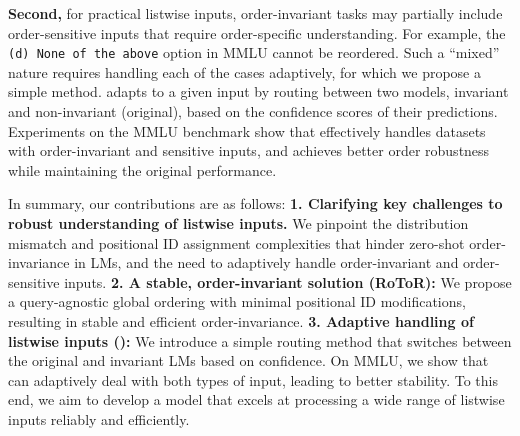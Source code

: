 \textbf{Second,} for practical listwise inputs, 
order-invariant tasks may partially include
order-sensitive inputs that require order-specific understanding. For example, the \texttt{(d) None of the above} option in MMLU cannot be reordered. Such a ``mixed'' nature
requires handling each of the cases adaptively, for which we propose a simple \sr{} method. \sr{} 
 adapts to a given input by routing between two models, invariant and non-invariant (original),
 based on the confidence scores of their predictions. Experiments on the MMLU benchmark show that \sr{} effectively handles datasets with order-invariant and sensitive inputs, and achieves better order robustness while maintaining the original performance.

In summary, our contributions are as follows:
\textbf{1. Clarifying key challenges to robust understanding of listwise inputs.} We pinpoint the distribution mismatch and positional ID assignment complexities that hinder zero-shot order-invariance in LMs, and the need to adaptively handle order-invariant and order-sensitive inputs. \textbf{2. A stable, order-invariant solution (RoToR):} We propose a query-agnostic global ordering with minimal positional ID modifications, resulting in stable and efficient order-invariance. \textbf{3. Adaptive handling of listwise inputs (\sr{}):} We introduce a simple routing method that switches between the original and invariant LMs based on confidence. On MMLU, we show that \sr{} can adaptively deal with both types of input, leading to better stability.
To this end, we aim to develop a model that excels at processing a wide range of listwise inputs reliably and efficiently.


